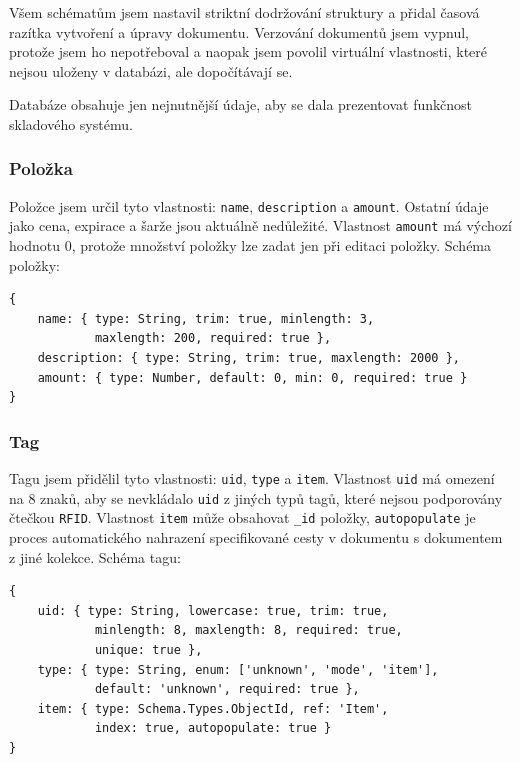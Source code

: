 \documentclass[czech,BP]{thesiskiv}
\begin{document}
	Všem schématům jsem nastavil striktní dodržování struktury a přidal časová razítka vytvoření a úpravy dokumentu.
	Verzování dokumentů jsem vypnul, protože jsem ho nepotřeboval a naopak jsem povolil virtuální vlastnosti, které nejsou uloženy v databázi, ale dopočítávají se.
	
	Databáze obsahuje jen nejnutnější údaje, aby se dala prezentovat funkčnost skladového systému. 	
	
\newpage	
	
	\subsubsection{Položka}
Položce jsem určil tyto vlastnosti: \texttt{name}, \texttt{description} a \texttt{amount}. Ostatní údaje jako cena, expirace a šarže jsou aktuálně nedůležité. Vlastnost \texttt{amount} má výchozí hodnotu 0, protože množství položky lze zadat jen při editaci položky. 
Schéma položky:	
\begingroup
\fontsize{10pt}{12pt}\selectfont
\begin{verbatim}
{
    name: { type: String, trim: true, minlength: 3,
            maxlength: 200, required: true },
    description: { type: String, trim: true, maxlength: 2000 },
    amount: { type: Number, default: 0, min: 0, required: true }
}
\end{verbatim}
\endgroup

	\subsubsection{Tag}
Tagu jsem přidělil tyto vlastnosti: \texttt{uid}, \texttt{type} a \texttt{item}. Vlastnost \texttt{uid} má omezení na 8 znaků, aby se nevkládalo \texttt{uid} z jiných typů tagů, které nejsou podporovány čtečkou \texttt{RFID}.
Vlastnost \texttt{item} může obsahovat \texttt{\_id} položky, \texttt{autopopulate} je proces automatického nahrazení specifikované cesty v dokumentu s dokumentem z jiné kolekce.
Schéma tagu:
\begingroup
\fontsize{10pt}{12pt}\selectfont
\begin{verbatim}
{
    uid: { type: String, lowercase: true, trim: true,
            minlength: 8, maxlength: 8, required: true,
            unique: true },
    type: { type: String, enum: ['unknown', 'mode', 'item'],
            default: 'unknown', required: true },
    item: { type: Schema.Types.ObjectId, ref: 'Item',
            index: true, autopopulate: true }
}
\end{verbatim}
\endgroup	

\newpage	
	
\end{document}
